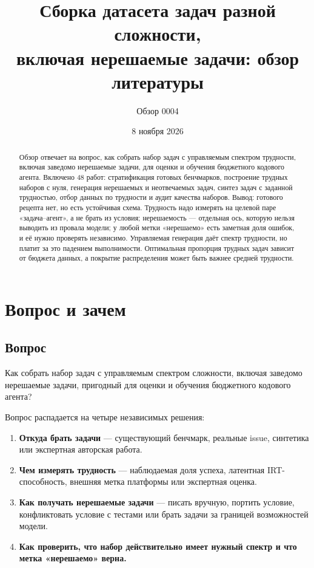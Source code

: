 \documentclass[11pt,a4paper]{article}
\title{Сборка датасета задач разной сложности,\\
включая нерешаемые задачи: обзор литературы}
\author{Обзор 0004}
\date{8 ноября 2026}
\begin{document}
\maketitle

\begin{abstract}
\noindent
Обзор отвечает на вопрос, как собрать набор задач с управляемым спектром
трудности, включая заведомо нерешаемые задачи, для оценки и обучения
бюджетного кодового агента. Включено 48 работ: стратификация готовых
бенчмарков, построение трудных наборов с нуля, генерация нерешаемых и
неотвечаемых задач, синтез задач с заданной трудностью, отбор данных по
трудности и аудит качества наборов. Вывод: готового рецепта нет, но есть
устойчивая схема. Трудность надо измерять на целевой паре «задача--агент», а
не брать из условия; нерешаемость — отдельная ось, которую нельзя выводить
из провала модели; у любой метки «нерешаемо» есть заметная доля ошибок, и
её нужно проверять независимо. Управляемая генерация даёт спектр трудности,
но платит за это падением выполнимости. Оптимальная пропорция трудных задач
зависит от бюджета данных, а покрытие распределения может быть важнее
средней трудности.
\end{abstract}

\section{Вопрос и зачем}

\subsection{Вопрос}

Как собрать набор задач с управляемым спектром сложности, включая заведомо
нерешаемые задачи, пригодный для оценки и обучения бюджетного кодового
агента?

Вопрос распадается на четыре независимых решения:

\begin{enumerate}
  \item \textbf{Откуда брать задачи} — существующий бенчмарк, реальные
        issue, синтетика или экспертная авторская работа.
  \item \textbf{Чем измерять трудность} — наблюдаемая доля успеха, латентная
        IRT-способность, внешняя метка платформы или экспертная оценка.
  \item \textbf{Как получать нерешаемые задачи} — писать вручную, портить
        условие, конфликтовать условие с тестами или брать задачи за
        границей возможностей модели.
  \item \textbf{Как проверить, что набор действительно имеет нужный спектр и
        что метка «нерешаемо» верна.}
\end{enumerate}
\end{document}
